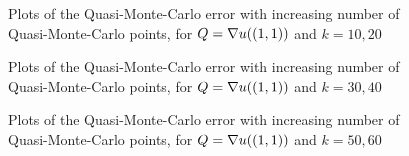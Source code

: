 \begin{figure}[h]
    \centering
  \begin{subfigure}{0.8\textwidth}

  \end{subfigure}
    \begin{subfigure}{0.8\textwidth}

    \end{subfigure}
\caption{Plots of the Quasi-Monte-Carlo error with increasing number of Quasi-Monte-Carlo points, for $Q=\nabla u((1,1))$ and $k=10,20$ \label{fig:qmcgradient_top_right1020}}
\end{figure}
\begin{figure}[h]
    \centering
  \begin{subfigure}{0.8\textwidth}

  \end{subfigure}
    \begin{subfigure}{0.8\textwidth}

    \end{subfigure}
\caption{Plots of the Quasi-Monte-Carlo error with increasing number of Quasi-Monte-Carlo points, for $Q=\nabla u((1,1))$ and $k=30,40$ \label{fig:qmcgradient_top_right3040}}
\end{figure}
\begin{figure}[h]
    \centering
  \begin{subfigure}{0.8\textwidth}

  \end{subfigure}
    \begin{subfigure}{0.8\textwidth}

    \end{subfigure}
\caption{Plots of the Quasi-Monte-Carlo error with increasing number of Quasi-Monte-Carlo points, for $Q=\nabla u((1,1))$ and $k=50,60$ \label{fig:qmcgradient_top_right5060}}
\end{figure}


